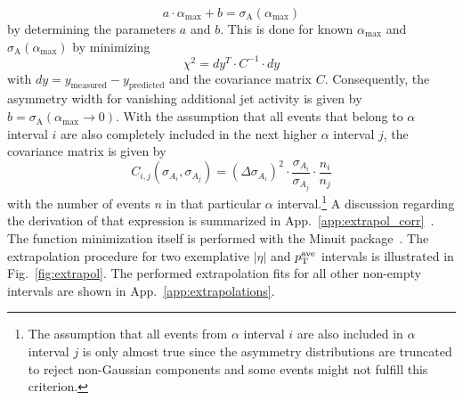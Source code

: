 \begin{equation}
 a \cdot \alpha_\mathrm{max} + b = \sigma_\mathrm{A}(\alpha_\mathrm{max})
\end{equation}
by determining the parameters $a$ and $b$. This is done for known $\alpha_\mathrm{max}$ and $\sigma_\mathrm{A}(\alpha_\mathrm{max})$ by minimizing 
\begin{equation}
\chi^2 = dy^T \cdot C^{-1} \cdot dy
\end{equation}
with $dy = y_{\mathrm{measured}} - y_{\mathrm{predicted}}$ and the covariance matrix $C$. Consequently, the asymmetry width for vanishing additional jet activity is given by $b=\sigma_\mathrm{A}(\alpha_\mathrm{max} \rightarrow 0)$. With the assumption that all events that belong to $\alpha$ interval $i$ are also completely included in the next higher $\alpha$ interval $j$, the covariance matrix is given by
\begin{equation}
C_{i,j}(\sigma_{A_i},\sigma_{A_j}) = (\Delta \sigma_{A_i})^2 \cdot \frac{\sigma_{A_i}}{\sigma_{A_j}} \cdot \frac{n_i}{n_j} 
\label{eq:jer_corr}
\end{equation}
with the number of events $n$ in that particular $\alpha$ interval.\footnote{The assumption that all events from $\alpha$ interval $i$ are also included in $\alpha$ interval $j$ is only almost true since the asymmetry distributions are truncated to reject non-Gaussian components and some events might not fulfill this criterion.} A discussion regarding the derivation of that expression is summarized in App.~\ref{app:extrapol_corr}~\cite{JOtt}. The function minimization itself is performed with the Minuit package~\cite{Minuit}. The extrapolation procedure for two exemplative $|\eta|$ and $p_{\text{T}}^\mathrm{ave}$ intervals is illustrated in Fig.~\ref{fig:extrapol}. The performed extrapolation fits for all other non-empty intervals are shown in App.~\ref{app:extrapolations}.   
